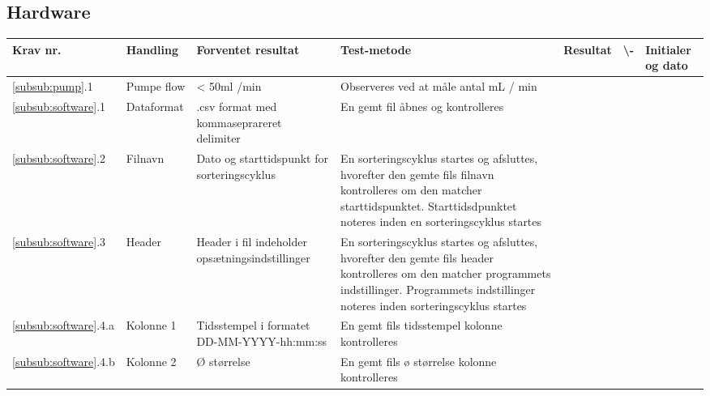  \subsection{Hardware}
 \begin{center}
		\begin{longtable}{ | m{1.785cm} | m{1.785cm}| m{1.785cm}| m{1.785cm}| m{1.785cm}| m{1.785cm}|m{1.785cm}| } 
			\hline
			\textbf{Krav nr.} &\textbf{ Handling} & \textbf{Forventet resultat} & \textbf{Test-metode} &\textbf{Resultat} & \textbf{ \checkmark \textbackslash -} & \textbf{Initialer og dato} \\ 
			\hline
			
			 
			\ref{subsub:pump}.1 &  Pumpe flow
   & < 50ml /min
    & Observeres ved at måle antal mL / min
    &  & & \\
			\hline	
		
			
						\ref{subsub:software}.1
			& 
Dataformat \
   & 
.csv format med kommaseprareret delimiter
    &
     En gemt fil åbnes og kontrolleres
    &  & & \\
			\hline
			
			
			
						\ref{subsub:software}.2
			& 
Filnavn \
   & 
Dato og starttidspunkt for sorteringscyklus
    &
     En sorteringscyklus startes og afsluttes, hvorefter den gemte fils filnavn kontrolleres om den matcher starttidspunktet. Starttidsdpunktet noteres inden en sorteringscyklus startes
    &  & & \\
				
				
				\hline	
			
						\ref{subsub:software}.3
			& 
Header \
   & 
Header i fil indeholder opsætningsindstillinger
    &
     En sorteringscyklus startes og afsluttes, hvorefter den gemte fils header kontrolleres om den matcher programmets indstillinger. Programmets indstillinger noteres inden sorteringscyklus startes
    &  & & \\
			\hline	
			
			\hline	
			
						\ref{subsub:software}.4.a
			& 
Kolonne 1 \
   & 
Tidsstempel i formatet DD-MM-YYYY-hh:mm:ss 
    &
     En gemt fils tidsstempel kolonne kontrolleres
    &  & & \\
			\hline	
			
			\hline	
			
						\ref{subsub:software}.4.b
			& 
Kolonne 2 \
   & 
Ø størrelse
    &
     En gemt fils ø størrelse kolonne kontrolleres
    &  & & \\
			\hline	
				
			
			
			
			
\end{longtable}
		
	\end{center}
	\pagebreak